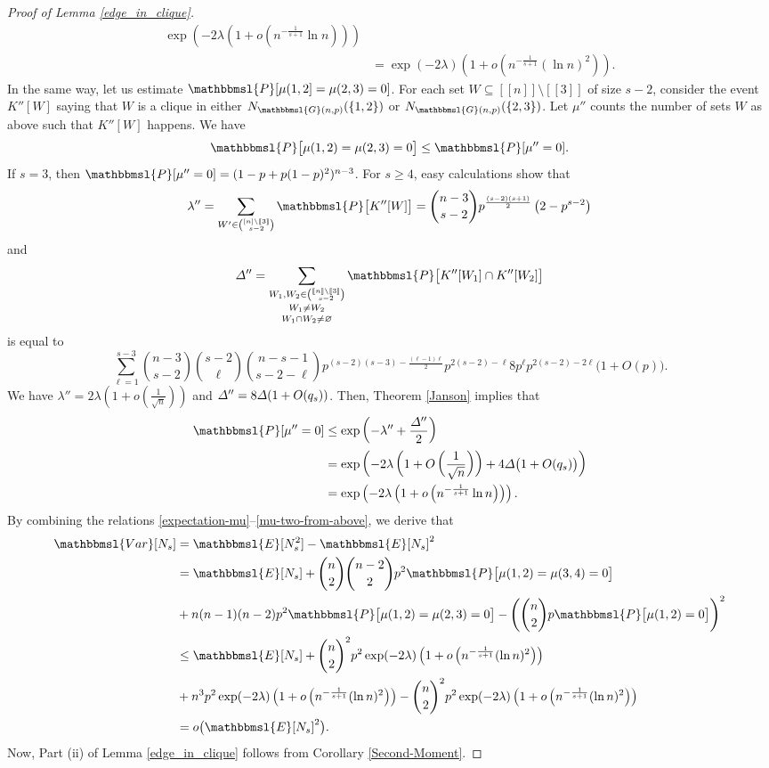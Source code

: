 \documentclass[hidelinks, 11pt]{article}
\theoremstyle{plain}
\theoremstyle{definition}
\begin{document}
\begin{proof}[Proof of Lemma \ref{edge_in_clique}]
\begin{align}
\exp\left(-2\lambda\left(1+o\left(n^{-\frac{1}{s+1}}\ln n\right)\right)\right)\nonumber\\&=\exp(-2\lambda)\left(1+o\left(n^{-\frac{1}{s+1}}(\ln  n)^2\right)\right).\label{mu-one-from-above}
\end{align}
In the same way, let us estimate $\mathbbmsl{P}[\mu(1,2]=\mu(2,3)=0]$.
For each  set $W\subseteq[\![n]\!]\setminus[\![3]\!]$ of size $s-2$, consider the  event $K''[W]$ saying that   $W$ is a clique in either $N_{\mathbbmsl{G}(n,p)}(\{1, 2\})$ or   $N_{\mathbbmsl{G}(n,p)}(\{2, 3\})$. Let $\mu''$ counts the number of sets $W$ as above such that $K''[W]$ happens. We have
\begin{equation}
\mathbbmsl{P}\big[\mu(1,2)=\mu(2,3)=0\big]\leq\mathbbmsl{P}[\mu''=0].\label{mu-two}
\end{equation}
If $s=3$, then $\mathbbmsl{P}[\mu''=0]=(1-p+p(1-p)^2)^{n-3}$. For $s\geq 4$, easy  calculations   show that
$$\lambda''=\sum_{W'\in{[n]\setminus[\![3]\!]\choose s-2}}\mathbbmsl{P}\big[K''[W]\big]={n-3\choose s-2}p^{\frac{(s-2)(s+1)}{2}}\left(2-p^{s-2}\right)$$ and
$$\mathnormal{\Delta}''=\mathop{\mathop{\sum_{W_1,W_2\in{[\![n]\!]\setminus[\![3]\!]\choose s-2}}}_{W_1\neq W_2}}_{W_1\cap W_2\neq\varnothing}\mathbbmsl{P}\big[K''[W_1]\cap K''[W_2]\big]$$ is equal to
$$\sum_{\ell=1}^{s-3}{n-3\choose s-2}{s-2\choose\ell}{n-s-1\choose s-2-\ell}p^{(s-2)(s-3)-\frac{(\ell-1)\ell}{2}}p^{2(s-2)-\ell}8p^{\ell}p^{2(s-2)-2\ell}\big(1+O(p)\big).$$
We have $\lambda''=2\lambda(1+o(\tfrac{1}{\sqrt{n}}))$ and $\mathnormal{\Delta}''=8\mathnormal{\Delta}(1+O(q_s))$.
Then, Theorem \ref{Janson} implies that
\begin{align}
\mathbbmsl{P}[\mu''=0]&\leq\exp\left(-\lambda''+\frac{\mathnormal{\Delta}''}{2}\right)\nonumber\\&=\exp\left(-2\lambda\left(1+O\left(\frac{1}{\sqrt{n}}\right)\right)+4\mathnormal{\Delta}\big(1+O(q_s)\big)\right)
\nonumber\\&=\exp\left(-2\lambda\left(1+o\left(n^{-\frac{1}{s+1}}\ln n\right)\right)\right).\label{mu-two-from-above}
\end{align}
By combining the relations \eqref{expectation-mu}--\eqref{mu-two-from-above}, we derive that
\begin{align*}
\mathbbmsl{Var}[N_s]&=\mathbbmsl{E}[N_s^2]-\mathbbmsl{E}[N_s]^2\\&=\mathbbmsl{E}[N_s]+{n\choose 2}{n-2\choose 2}p^2\mathbbmsl{P}\big[\mu(1,2)=\mu(3,4)=0\big]\\&+
n(n-1)(n-2)p^2\mathbbmsl{P}\big[\mu(1,2)=\mu(2,3)=0\big]-\left({n\choose 2}p\mathbbmsl{P}\big[\mu(1,2)=0\big]\right)^2\\&\leq
\mathbbmsl{E}[N_s]+{n\choose 2}^2p^2\exp(-2\lambda)\left(1+o\left(n^{-\frac{1}{s+1}}(\ln n)^2\right)\right)\\&+
n^3p^2\exp(-2\lambda)\left(1+o\left(n^{-\frac{1}{s+1}}(\ln n)^2\right)\right) - {n\choose 2}^2p^2\exp(-2\lambda)\left(1+o\left(n^{-\frac{1}{s+1}}(\ln n)^2\right)\right)\\&=o\big(\mathbbmsl{E}[N_s]^2\big).
\end{align*}
Now, Part (ii)  of Lemma \ref{edge_in_clique}  follows from Corollary   \ref{Second-Moment}.
\end{proof}
\end{document}
